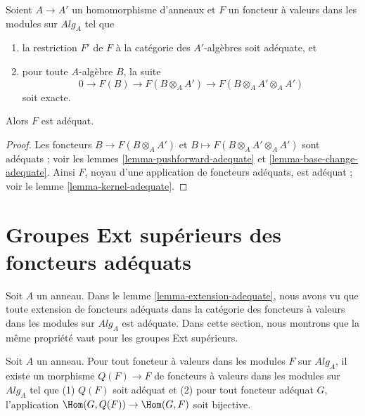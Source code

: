 \begin{lemma}
\label{lemma-adequate-descent}
Soient $A \to A'$ un homomorphisme d'anneaux et $F$ un foncteur à valeurs dans les modules sur
$\textit{Alg}_A$ tel que
\begin{enumerate}
\item la restriction $F'$ de $F$ à la catégorie des $A'$-algèbres soit
adéquate, et
\item pour toute $A$-algèbre $B$, la suite
$$
0 \to F(B) \to F(B \otimes_A A') \to F(B \otimes_A A' \otimes_A A')
$$
soit exacte.
\end{enumerate}
Alors $F$ est adéquat.
\end{lemma}

\begin{proof}
Les foncteurs $B \to F(B \otimes_A A')$ et
$B \mapsto F(B \otimes_A A' \otimes_A A')$ sont adéquats ; voir les
lemmes \ref{lemma-pushforward-adequate} et
\ref{lemma-base-change-adequate}.
Ainsi $F$, noyau d'une application de foncteurs adéquats, est adéquat ; voir le
lemme \ref{lemma-kernel-adequate}.
\end{proof}






\section{Groupes Ext supérieurs des foncteurs adéquats}
\label{section-higher-ext}

\noindent
Soit $A$ un anneau. Dans le
lemme \ref{lemma-extension-adequate},
nous avons vu que toute extension de foncteurs adéquats dans la catégorie
des foncteurs à valeurs dans les modules sur $\textit{Alg}_A$ est adéquate. Dans cette
section, nous montrons que la même propriété vaut pour les groupes Ext supérieurs.

\begin{lemma}
\label{lemma-adjoint}
Soit $A$ un anneau.
Pour tout foncteur à valeurs dans les modules $F$ sur $\textit{Alg}_A$,
il existe un morphisme $Q(F) \to F$ de foncteurs à valeurs dans les modules sur
$\textit{Alg}_A$ tel que (1) $Q(F)$ soit adéquat et (2) pour tout
foncteur adéquat $G$, l'application $\Hom(G, Q(F)) \to \Hom(G, F)$
soit bijective.
\end{lemma}

